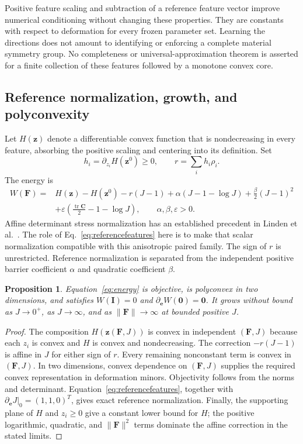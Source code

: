 \documentclass[10pt,a4paper]{article}
\newcommand{\F}{\bm F}
\newcommand{\C}{\bm C}
\newcommand{\I}{\bm I}
\newcommand{\ee}{\bm e}
\newcommand{\tr}{\operatorname{tr}}
\newtheorem{proposition}{Proposition}
\begin{document}
Positive feature scaling and subtraction of a reference feature vector improve numerical conditioning without changing these properties. They are constants with respect to deformation for every frozen parameter set. Learning the directions does not amount to identifying or enforcing a complete material symmetry group. No completeness or universal-approximation theorem is asserted for a finite collection of these features followed by a monotone convex core.

\subsection{Reference normalization, growth, and polyconvexity}
Let $H(\bm z)$ denote a differentiable convex function that is nondecreasing in every feature, absorbing the positive scaling and centering into its definition. Set
\begin{equation}
 h_i=\partial_{z_i}H(\bm z^0)\geq0,\qquad r=\sum_i h_i\rho_i.
\end{equation}
The energy is
\begin{align}
 W(\F)={}&H(\bm z)-H(\bm z^0)-r(J-1)
 +\alpha(J-1-\log J)+\frac\beta2(J-1)^2\nonumber\\
 &+\varepsilon\left(\frac{\tr\C}{2}-1-\log J\right),
 \qquad \alpha,\beta,\varepsilon>0.
 \label{eq:energy}
\end{align}
Affine determinant stress normalization has an established precedent in Linden et al.~\cite{linden2023}. The role of Eq.~\eqref{eq:referencefeatures} here is to make that scalar normalization compatible with this anisotropic paired family. The sign of $r$ is unrestricted. Reference normalization is separated from the independent positive barrier coefficient $\alpha$ and quadratic coefficient $\beta$.

\begin{proposition}
Equation~\eqref{eq:energy} is objective, is polyconvex in two dimensions, and satisfies $W(\I)=0$ and $\partial_{\ee}W(\bm0)=\bm0$. It grows without bound as $J\to0^+$, as $J\to\infty$, and as $\|\F\|\to\infty$ at bounded positive $J$.
\end{proposition}
\begin{proof}
The composition $H(\bm z(\F,J))$ is convex in independent $(\F,J)$ because each $z_i$ is convex and $H$ is convex and nondecreasing. The correction $-r(J-1)$ is affine in $J$ for either sign of $r$. Every remaining nonconstant term is convex in $(\F,J)$. In two dimensions, convex dependence on $(\F,J)$ supplies the required convex representation in deformation minors. Objectivity follows from the norms and determinant. Equation~\eqref{eq:referencefeatures}, together with $\partial_{\ee}J|_0=(1,1,0)^T$, gives exact reference normalization. Finally, the supporting plane of $H$ and $z_i\geq0$ give a constant lower bound for $H$; the positive logarithmic, quadratic, and $\|\F\|^2$ terms dominate the affine correction in the stated limits.
\end{proof}
\end{document}
